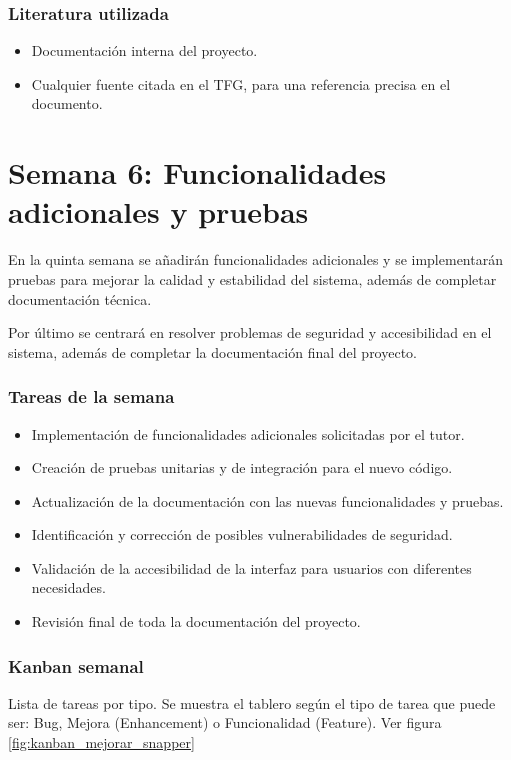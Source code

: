 \subsubsection{Literatura utilizada}
\begin{itemize}
    \item Documentación interna del proyecto.
    \item Cualquier fuente citada en el TFG, para una referencia precisa en el documento.
\end{itemize}


\section{Semana 6: Funcionalidades adicionales y pruebas}
En la quinta semana se añadirán funcionalidades adicionales y se implementarán pruebas para mejorar la calidad y estabilidad del sistema, además de completar documentación técnica.

Por último se centrará en resolver problemas de seguridad y accesibilidad en el sistema, además de completar la documentación final del proyecto.

\subsubsection{Tareas de la semana}
\begin{itemize}
    \item Implementación de funcionalidades adicionales solicitadas por el tutor.
    \item Creación de pruebas unitarias y de integración para el nuevo código.
    \item Actualización de la documentación con las nuevas funcionalidades y pruebas.
    \item Identificación y corrección de posibles vulnerabilidades de seguridad.
    \item Validación de la accesibilidad de la interfaz para usuarios con diferentes necesidades.
    \item Revisión final de toda la documentación del proyecto.
\end{itemize}
\subsubsection{Kanban semanal}
Lista de tareas por tipo. Se muestra el tablero según el tipo de tarea que puede ser: Bug, Mejora (Enhancement) o Funcionalidad (Feature). Ver figura \ref{fig:kanban_mejorar_snapper}

